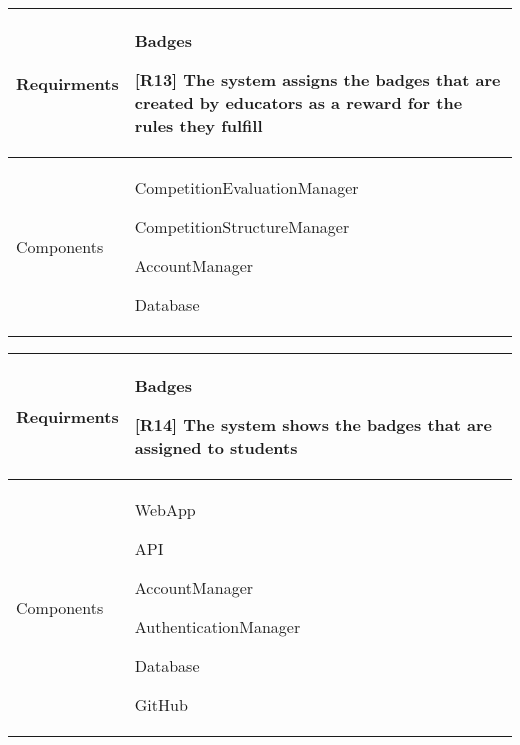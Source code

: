     
    \begin{table}[!h]
        \centering
        \begin{tabular}{ | m{6em} | m{30em} |} 
            \hline
             Requirments&\textbf{Badges}
             
            
    [R13] The system assigns the badges that are created by educators as a reward for the rules they fulfill
    \\
            \hline
             Components& 
             CompetitionEvaluationManager
             
             
             CompetitionStructureManager
             
             
             AccountManager
             
             Database\\
             \hline
        \end{tabular}
        \label{tab:my_label}
    \end{table}

    \begin{table}[!h]
        \centering
        \begin{tabular}{ | m{6em} | m{30em} |} 
            \hline
             Requirments&\textbf{Badges}
             
            
    [R14] The system shows the badges that are assigned to students
    \\
            \hline
             Components& 
             WebApp

             API
             
             
             AccountManager
             
             AuthenticationManager
             
             Database

             GitHub
             \\
             \hline
        \end{tabular}
        \label{tab:my_label}
    \end{table}

